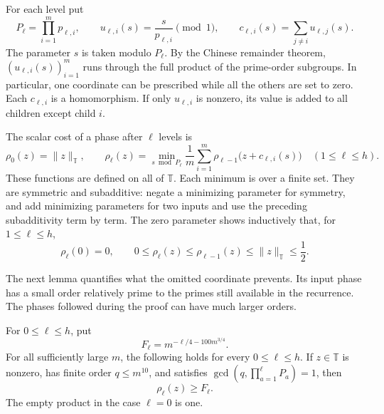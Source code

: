 For each level put
\begin{equation}\label{eq:exc-translations}
 P_\ell=\prod_{i=1}^m p_{\ell,i},\qquad
 u_{\ell,i}(s)=\frac{s}{p_{\ell,i}}\pmod1,\qquad
 c_{\ell,i}(s)=\sum_{j\ne i}u_{\ell,j}(s).
\end{equation}
The parameter $s$ is taken modulo $P_\ell$.  By the Chinese remainder
theorem, $(u_{\ell,i}(s))_{i=1}^m$ runs through the full product of the
prime-order subgroups.  In particular, one coordinate can be prescribed
while all the others are set to zero.  Each $c_{\ell,i}$ is a homomorphism.
If only $u_{\ell,i}$ is nonzero, its value is added to all children except
child $i$.

The scalar cost of a phase after $\ell$ levels is
\begin{equation}\label{eq:exc-rho}
 \rho_0(z)=\|z\|_{\mathbb T},\qquad
 \rho_\ell(z)=\min_{s\bmod P_\ell}
       \frac1m\sum_{i=1}^m
          \rho_{\ell-1}\bigl(z+c_{\ell,i}(s)\bigr)
       \quad(1\le\ell\le h).
\end{equation}
These functions are defined on all of $\mathbb T$.  Each minimum is over a
finite set.
They are symmetric and subadditive: negate a minimizing parameter for
symmetry, and add minimizing parameters for two inputs and use the preceding
subadditivity term by term.  The zero parameter shows inductively that, for
$1\le\ell\le h$,
\[
 \rho_\ell(0)=0,\qquad
 0\le \rho_\ell(z)\le \rho_{\ell-1}(z)
       \le\|z\|_{\mathbb T}\le\frac12.
\]

The next lemma quantifies what the omitted coordinate prevents.  Its input
phase has a small order relatively prime to the primes still available in
the recurrence.  The phases followed during the proof can have much larger
orders.

\begin{lemma}\label{lem:exc-small-cost}
For $0\le\ell\le h$, put
\[
 F_\ell=m^{-\ell/4-100m^{3/4}}.
\]
For all sufficiently large $m$, the following holds for every
$0\le\ell\le h$.  If $z\in\mathbb T$ is nonzero, has finite order
$q\le m^{10}$, and satisfies
$\gcd(q,\prod_{a=1}^{\ell}P_a)=1$, then
\begin{equation}\label{eq:exc-phase-lower}
 \rho_\ell(z)\ge F_\ell.
\end{equation}
The empty product in the case $\ell=0$ is one.
\end{lemma}


